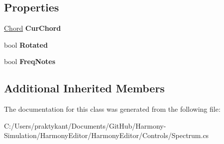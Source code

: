 \subsection*{Properties}
\begin{DoxyCompactItemize}
\item 
\hypertarget{class_harmony_editor_1_1_spectrum_a993abb04ea909dbebad7da17e10cc642}{\hyperlink{class_periodic_chords_1_1_chord}{Chord} {\bfseries Cur\+Chord}}\label{class_harmony_editor_1_1_spectrum_a993abb04ea909dbebad7da17e10cc642}

\item 
\hypertarget{class_harmony_editor_1_1_spectrum_ad57883de83d316e57be550b6f883d000}{bool {\bfseries Rotated}}\label{class_harmony_editor_1_1_spectrum_ad57883de83d316e57be550b6f883d000}

\item 
\hypertarget{class_harmony_editor_1_1_spectrum_a72c7c1f115b7b903f874066fe9610439}{bool {\bfseries Freq\+Notes}}\label{class_harmony_editor_1_1_spectrum_a72c7c1f115b7b903f874066fe9610439}

\end{DoxyCompactItemize}
\subsection*{Additional Inherited Members}


The documentation for this class was generated from the following file\+:\begin{DoxyCompactItemize}
\item 
C\+:/\+Users/praktykant/\+Documents/\+Git\+Hub/\+Harmony-\/\+Simulation/\+Harmony\+Editor/\+Harmony\+Editor/\+Controls/Spectrum.\+cs\end{DoxyCompactItemize}
